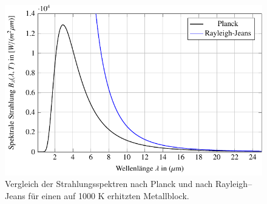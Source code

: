 %
%
%
\begin{figure}
\centering
\includegraphics{papers/fourier/images/strahlung.pdf}
\caption{Vergleich der Strahlungsspektren nach Planck und nach Rayleigh–Jeans für einen auf 1000 K erhitzten Metallblock.%
\label{fourier:fig:strahlungsspektren}}
\end{figure}